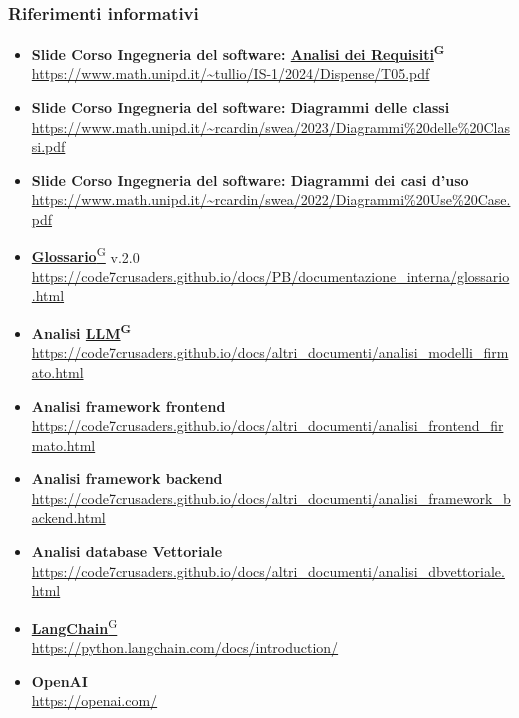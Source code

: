 \subsubsection{Riferimenti informativi}
\begin{itemize}
    \item \textbf{Slide Corso Ingegneria del software: \href{https://code7crusaders.github.io/docs/PB/documentazione_interna/glossario.html#analisi-dei-requisiti}{Analisi dei Requisiti}\textsuperscript{G}} \\ \url{https://www.math.unipd.it/~tullio/IS-1/2024/Dispense/T05.pdf}
    \item \textbf{Slide Corso Ingegneria del software: Diagrammi delle classi} \\ \url{https://www.math.unipd.it/~rcardin/swea/2023/Diagrammi%20delle%20Classi.pdf}
    \item \textbf{Slide Corso Ingegneria del software: Diagrammi dei casi d'uso}\\ \url{https://www.math.unipd.it/~rcardin/swea/2022/Diagrammi%20Use%20Case.pdf}
    \item \href{https://code7crusaders.github.io/docs/PB/documentazione_interna/glossario.html#glossario}{\textbf{Glossario}\textsuperscript{G}} v.2.0 \\ \url{https://code7crusaders.github.io/docs/PB/documentazione_interna/glossario.html}
    \item \textbf{Analisi \href{https://code7crusaders.github.io/docs/PB/documentazione_interna/glossario.html#llm-large-language-model}{LLM}\textsuperscript{G}} \\ \url{https://code7crusaders.github.io/docs/altri_documenti/analisi_modelli_firmato.html}
    \item \textbf{Analisi framework frontend} \\ \url{https://code7crusaders.github.io/docs/altri_documenti/analisi_frontend_firmato.html}
    \item \textbf{Analisi framework backend} \\ \url{https://code7crusaders.github.io/docs/altri_documenti/analisi_framework_backend.html}
    \item \textbf{Analisi database Vettoriale} \\ \url{https://code7crusaders.github.io/docs/altri_documenti/analisi_dbvettoriale.html}
    \item \href{https://code7crusaders.github.io/docs/PB/documentazione_interna/glossario.html#langchain}{\textbf{LangChain}\textsuperscript{G}} \\ \url{https://python.langchain.com/docs/introduction/}
    \item \textbf{OpenAI} \\ \url{https://openai.com/}
\end{itemize}
